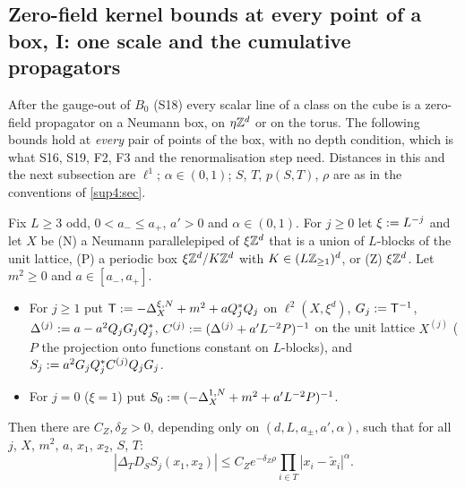 
\subsection{Zero-field kernel bounds at every point of a box, I: one scale and the cumulative propagators}\label{sup4:ssec:zeroA}

After the gauge-out of $B_0$ (S18) every scalar line of a class on the cube is a zero-field propagator on a Neumann box, on $\eta\mathbb Z^d$ or on the torus. The following bounds hold at \emph{every} pair of points of the box, with no depth condition, which is what S16, S19, F2, F3 and the renormalisation step need. Distances in this and the next subsection are $\ell^1$; $\alpha\in(0,1)$; $S$, $T$, $p(S,T)$, $\rho$ are as in the conventions of \cref{sup4:sec}.

\begin{lemma}\label{sup4:lem:Z}
Fix $L\ge3$ odd, $0<a_-\le a_+$, $a'>0$ and $\alpha\in(0,1)$. For $j\ge0$ let $\xi:= L^{-j}$ and let $X$ be \textup{(N)} a Neumann parallelepiped of $\xi\mathbb Z^d$ that is a union of $L$-blocks of the unit lattice, \textup{(P)} a periodic box $\xi\mathbb Z^d/K\mathbb Z^d$ with $K\in(L\mathbb Z_{\ge1})^d$, or \textup{(Z)} $\xi\mathbb Z^d$. Let $m^2\ge0$ and $a\in[a_-,a_+]$.
\begin{itemize}[nosep,leftmargin=*]
\item For $j\ge1$ put $\mathsf T:=-\Delta^{\xi,N}_X+m^2+aQ_j^*Q_j$ on $\ell^2(X,\xi^d)$, $G_j:=\mathsf T^{-1}$, $\Delta^{(j)}:= a-a^2Q_jG_jQ_j^*$, $C^{(j)}:=(\Delta^{(j)}+a'L^{-2}P)^{-1}$ on the unit lattice $X^{(j)}$ ($P$ the projection onto functions constant on $L$-blocks), and $S_j:= a^2G_jQ_j^*C^{(j)}Q_jG_j$.
\item For $j=0$ ($\xi=1$) put $S_0:=(-\Delta^{1,N}_X+m^2+a'L^{-2}P)^{-1}$.
\end{itemize}
Then there are $C_Z,\delta_Z>0$, depending only on $(d,L,a_\pm,a',\alpha)$, such that for all $j$, $X$, $m^2$, $a$, $x_1$, $x_2$, $S$, $T$:
\begin{equation}\label{sup4:eq:Z}
|\Delta_TD_SS_j(x_1,x_2)|\le C_Ze^{-\delta_Z\rho}\prod_{i\in T}|x_i-\tilde x_i|^\alpha.
\end{equation}
\end{lemma}

